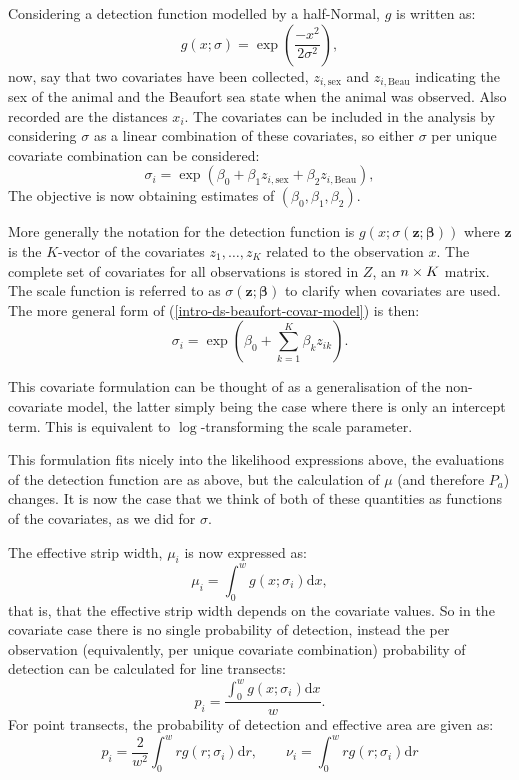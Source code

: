 Considering a detection function modelled by a half-Normal, $g$ is written as:
\begin{equation*}
g(x; \sigma) = \exp\left (\frac{-x^2}{2\sigma^2}\right ),
\end{equation*}
now, say that two covariates have been collected, $z_{i,\text{sex}}$ and $z_{i,\text{Beau}}$ indicating the sex of the animal and the Beaufort sea state when the animal was observed. Also recorded are the distances $x_i$. The covariates can be included in the analysis by considering $\sigma$ as a linear combination of these covariates, so either $\sigma$ per unique covariate combination can be considered:
\begin{equation}
\sigma_i = \exp( \beta_0 + \beta_1 z_{i,\text{sex}} + \beta_2 z_{i,\text{Beau}}),
\label{intro-ds-beaufort-covar-model}
\end{equation}
The objective is now obtaining estimates of $(\beta_0, \beta_1, \beta_2)$.

More generally the notation for the detection function is $g(x ; \sigma(\bm{z}; \bm{\beta}))$ where $\bm{z}$ is the $K$-vector of the covariates $z_1, \dots, z_K$ related to the observation $x$. The complete set of covariates for all observations is stored in $Z$, an $n \times K$ matrix. The scale function is referred to as $\sigma(\bm{z}; \bm{\beta})$ to clarify when covariates are used. The more general form of (\ref{intro-ds-beaufort-covar-model}) is then:
\begin{equation}
\sigma_{i} = \exp( \beta_{0} + \sum_{k=1}^K \beta_k z_{ik}).
\label{intro-ds-covar-model}
\end{equation}

This covariate formulation can be thought of as a generalisation of the non-covariate model, the latter simply being the case where there is only an intercept term. This is equivalent to $\log$-transforming the scale parameter.

This formulation fits nicely into the likelihood expressions above, the evaluations of the detection function are as above, but the calculation of $\mu$ (and therefore $P_a$) changes. It is now the case that we think of both of these quantities as functions of the covariates, as we did for $\sigma$.

The effective strip width, $\mu_i$ is now expressed as:
\begin{equation}
\mu_i = \int_0^w g(x ; \sigma_i) \text{d}x,
\label{intro-ds-mu-covar}
\end{equation}
that is, that the effective strip width depends on the covariate values. So in the covariate case there is no single probability of detection, instead the per observation (equivalently, per unique covariate combination) probability of detection can be calculated for line transects:
\begin{equation*}
p_i = \frac{\int_0^w g(x ; \sigma_{i}) \text{d}x}{w}.
\end{equation*}
For point transects, the probability of detection and effective area are given as:
\begin{equation*}
p_i =\frac{2}{w^2}\int_0^w r g(r; \sigma_i) \text{d}r, \qquad \nu_i = \int_0^w r g(r; \sigma_i) \text{d}r
\end{equation*}

